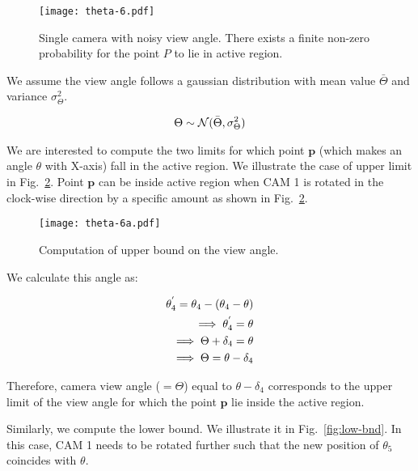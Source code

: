 \begin{figure}[htb]
\centering
\texttt{[image: theta-6.pdf]} 
\caption[Illustration of a single camera with noisy view angle.]{Single camera with noisy view angle. There exists a finite non-zero probability for the point $P$ to lie in active region.}
\label{fig:nois-act}
\end{figure}

We assume the view angle follows a gaussian distribution with mean value $\bar{\Theta}$ and variance $\sigma_\Theta^2$.

\begin{equation}
\centering
\begin{aligned}
\Theta \sim \mathcal{N}(\bar{\Theta} , \sigma_\Theta^2)
\end{aligned}
\end{equation}

We are interested to compute the two limits for which point $\mathbf{p}$ (which makes an angle $\theta$ with X-axis) fall in the active region. We illustrate the case of upper limit in Fig.~\ref{fig:upp-bnd}. Point $\mathbf{p}$ can be inside active region when CAM 1 is rotated in the clock-wise direction by a specific amount as shown in Fig.~\ref{fig:upp-bnd}.

\begin{figure}[htb]
\centering
\texttt{[image: theta-6a.pdf]} 
\caption{Computation of upper bound on the view angle.}
\label{fig:upp-bnd}
\end{figure}

We calculate this angle as:

\begin{equation}
\centering
\begin{aligned}
\theta_4^{'} = \theta_4 - (\theta_4 - \theta)\\
\implies \theta_4^{'} = \theta \\
\implies \Theta + \delta_4 = \theta \\
\implies \Theta  = \theta - \delta_4
\end{aligned}
\end{equation}

Therefore, camera view angle ($=\Theta$) equal to $\theta - \delta_4$ corresponds to the upper limit of the view angle for which the point $\mathbf{p}$ lie inside the active region.

Similarly, we compute the lower bound. We illustrate it in Fig.~\ref{fig:low-bnd}. In this case, CAM 1 needs to be rotated further such that the new position of $\theta_5$ coincides with $\theta$. 

